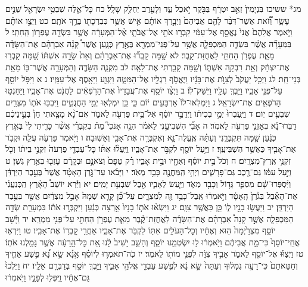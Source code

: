 \documentclass[twoside, openany, parskip=half, 11pt]{book}
\begin{document}
מג* ששיכז בִּנְיָמִין֙ זְאֵ֣ב יִטְרָ֔ף בַּבֹּ֖קֶר יֹ֣אכַל עַ֑ד וְלָעֶ֖רֶב יְחַלֵּ֥ק שָׁלָֽל׃ כח כׇּל־אֵ֛לֶּה שִׁבְטֵ֥י יִשְׂרָאֵ֖ל שְׁנֵ֣ים עָשָׂ֑ר וְ֠זֹ֠את אֲשֶׁר־דִּבֶּ֨ר לָהֶ֤ם אֲבִיהֶם֙ וַיְבָ֣רֶךְ אוֹתָ֔ם אִ֛ישׁ אֲשֶׁ֥ר כְּבִרְכָת֖וֹ בֵּרַ֥ךְ אֹתָֽם׃ כט וַיְצַ֣ו אוֹתָ֗ם וַיֹּ֤אמֶר אֲלֵהֶם֙ אֲנִי֙ נֶאֱסָ֣ף אֶל־עַמִּ֔י קִבְר֥וּ אֹתִ֖י אֶל־אֲבֹתָ֑י אֶ֨ל־הַמְּעָרָ֔ה אֲשֶׁ֥ר בִּשְׂדֵ֖ה עֶפְר֥וֹן הַֽחִתִּֽי׃ ל בַּמְּעָרָ֞ה אֲשֶׁ֨ר בִּשְׂדֵ֧ה הַמַּכְפֵּלָ֛ה אֲשֶׁ֥ר עַל־פְּנֵי־מַמְרֵ֖א בְּאֶ֣רֶץ כְּנָ֑עַן אֲשֶׁר֩ קָנָ֨ה אַבְרָהָ֜ם אֶת־הַשָּׂדֶ֗ה מֵאֵ֛ת עֶפְרֹ֥ן הַחִתִּ֖י לַאֲחֻזַּת־קָֽבֶר׃ לא שָׁ֣מָּה קָֽבְר֞וּ אֶת־אַבְרָהָ֗ם וְאֵת֙ שָׂרָ֣ה אִשְׁתּ֔וֹ שָׁ֚מָּה קָבְר֣וּ אֶת־יִצְחָ֔ק וְאֵ֖ת רִבְקָ֣ה אִשְׁתּ֑וֹ וְשָׁ֥מָּה קָבַ֖רְתִּי אֶת־לֵאָֽה׃ לב מִקְנֵ֧ה הַשָּׂדֶ֛ה וְהַמְּעָרָ֥ה אֲשֶׁר־בּ֖וֹ מֵאֵ֥ת בְּנֵי־חֵֽת׃ לג וַיְכַ֤ל יַעֲקֹב֙ לְצַוֺּ֣ת אֶת־בָּנָ֔יו וַיֶּאֱסֹ֥ף רַגְלָ֖יו אֶל־הַמִּטָּ֑ה וַיִּגְוַ֖ע וַיֵּאָ֥סֶף אֶל־עַמָּֽיו׃ נ א וַיִּפֹּ֥ל יוֹסֵ֖ף עַל־פְּנֵ֣י אָבִ֑יו וַיֵּ֥בְךְּ עָלָ֖יו וַיִּשַּׁק־לֽוֹ׃ ב וַיְצַ֨ו יוֹסֵ֤ף אֶת־עֲבָדָיו֙ אֶת־הָרֹ֣פְאִ֔ים לַחֲנֹ֖ט אֶת־אָבִ֑יו וַיַּחַנְט֥וּ הָרֹפְאִ֖ים אֶת־יִשְׂרָאֵֽל׃ ג וַיִּמְלְאוּ־לוֹ֙ אַרְבָּעִ֣ים י֔וֹם כִּ֛י כֵּ֥ן יִמְלְא֖וּ יְמֵ֣י הַחֲנֻטִ֑ים וַיִּבְכּ֥וּ אֹת֛וֹ מִצְרַ֖יִם שִׁבְעִ֥ים יֽוֹם׃ ד וַיַּֽעַבְרוּ֙ יְמֵ֣י בְכִית֔וֹ וַיְדַבֵּ֣ר יוֹסֵ֔ף אֶל־בֵּ֥ית פַּרְעֹ֖ה לֵאמֹ֑ר אִם־נָ֨א מָצָ֤אתִי חֵן֙ בְּעֵ֣ינֵיכֶ֔ם דַּבְּרוּ־נָ֕א בְּאׇזְנֵ֥י פַרְעֹ֖ה לֵאמֹֽר׃ ה אָבִ֞י הִשְׁבִּיעַ֣נִי לֵאמֹ֗ר הִנֵּ֣ה אָנֹכִי֮ מֵת֒ בְּקִבְרִ֗י אֲשֶׁ֨ר כָּרִ֤יתִי לִי֙ בְּאֶ֣רֶץ כְּנַ֔עַן שָׁ֖מָּה תִּקְבְּרֵ֑נִי וְעַתָּ֗ה אֶֽעֱלֶה־נָּ֛א וְאֶקְבְּרָ֥ה אֶת־אָבִ֖י וְאָשֽׁוּבָה׃ ו וַיֹּ֖אמֶר פַּרְעֹ֑ה עֲלֵ֛ה וּקְבֹ֥ר אֶת־אָבִ֖יךָ כַּאֲשֶׁ֥ר הִשְׁבִּיעֶֽךָ׃ ז וַיַּ֥עַל יוֹסֵ֖ף לִקְבֹּ֣ר אֶת־אָבִ֑יו וַיַּֽעֲל֨וּ אִתּ֜וֹ כׇּל־עַבְדֵ֤י פַרְעֹה֙ זִקְנֵ֣י בֵית֔וֹ וְכֹ֖ל זִקְנֵ֥י אֶֽרֶץ־מִצְרָֽיִם׃ ח וְכֹל֙ בֵּ֣ית יוֹסֵ֔ף וְאֶחָ֖יו וּבֵ֣ית אָבִ֑יו רַ֗ק טַפָּם֙ וְצֹאנָ֣ם וּבְקָרָ֔ם עָזְב֖וּ בְּאֶ֥רֶץ גֹּֽשֶׁן׃ ט וַיַּ֣עַל עִמּ֔וֹ גַּם־רֶ֖כֶב גַּם־פָּרָשִׁ֑ים וַיְהִ֥י הַֽמַּחֲנֶ֖ה כָּבֵ֥ד מְאֹֽד׃ י וַיָּבֹ֜אוּ עַד־גֹּ֣רֶן הָאָטָ֗ד אֲשֶׁר֙ בְּעֵ֣בֶר הַיַּרְדֵּ֔ן וַיִּ֨סְפְּדוּ־שָׁ֔ם מִסְפֵּ֛ד גָּד֥וֹל וְכָבֵ֖ד מְאֹ֑ד וַיַּ֧עַשׂ לְאָבִ֛יו אֵ֖בֶל שִׁבְעַ֥ת יָמִֽים׃ יא וַיַּ֡רְא יוֹשֵׁב֩ הָאָ֨רֶץ הַֽכְּנַעֲנִ֜י אֶת־הָאֵ֗בֶל בְּגֹ֙רֶן֙ הָֽאָטָ֔ד וַיֹּ֣אמְר֔וּ אֵֽבֶל־כָּבֵ֥ד זֶ֖ה לְמִצְרָ֑יִם עַל־כֵּ֞ן קָרָ֤א שְׁמָהּ֙ אָבֵ֣ל מִצְרַ֔יִם אֲשֶׁ֖ר בְּעֵ֥בֶר הַיַּרְדֵּֽן׃ יב וַיַּעֲשׂ֥וּ בָנָ֖יו ל֑וֹ כֵּ֖ן כַּאֲשֶׁ֥ר צִוָּֽם׃ יג וַיִּשְׂא֨וּ אֹת֤וֹ בָנָיו֙ אַ֣רְצָה כְּנַ֔עַן וַיִּקְבְּר֣וּ אֹת֔וֹ בִּמְעָרַ֖ת שְׂדֵ֣ה הַמַּכְפֵּלָ֑ה אֲשֶׁ֣ר קָנָה֩ אַבְרָהָ֨ם אֶת־הַשָּׂדֶ֜ה לַאֲחֻזַּת־קֶ֗בֶר מֵאֵ֛ת עֶפְרֹ֥ן הַחִתִּ֖י עַל־פְּנֵ֥י מַמְרֵֽא׃ יד וַיָּ֨שׇׁב יוֹסֵ֤ף מִצְרַ֙יְמָה֙ ה֣וּא וְאֶחָ֔יו וְכׇל־הָעֹלִ֥ים אִתּ֖וֹ לִקְבֹּ֣ר אֶת־אָבִ֑יו אַחֲרֵ֖י קׇבְר֥וֹ אֶת־אָבִֽיו׃ טו וַיִּרְא֤וּ אֲחֵֽי־יוֹסֵף֙ כִּי־מֵ֣ת אֲבִיהֶ֔ם וַיֹּ֣אמְר֔וּ ל֥וּ יִשְׂטְמֵ֖נוּ יוֹסֵ֑ף וְהָשֵׁ֤ב יָשִׁיב֙ לָ֔נוּ אֵ֚ת כׇּל־הָ֣רָעָ֔ה אֲשֶׁ֥ר גָּמַ֖לְנוּ אֹתֽוֹ׃ טז וַיְצַוּ֕וּ אֶל־יוֹסֵ֖ף לֵאמֹ֑ר אָבִ֣יךָ צִוָּ֔ה לִפְנֵ֥י מוֹת֖וֹ לֵאמֹֽר׃ יז כֹּֽה־תֹאמְר֣וּ לְיוֹסֵ֗ף אָ֣נָּ֡א שָׂ֣א נָ֠א פֶּ֣שַׁע אַחֶ֤יךָ וְחַטָּאתָם֙ כִּי־רָעָ֣ה גְמָל֔וּךָ וְעַתָּה֙ שָׂ֣א נָ֔א לְפֶ֥שַׁע עַבְדֵ֖י אֱלֹהֵ֣י אָבִ֑יךָ וַיֵּ֥בְךְּ יוֹסֵ֖ף בְּדַבְּרָ֥ם אֵלָֽיו׃ יח וַיֵּלְכוּ֙ גַּם־אֶחָ֔יו וַֽיִּפְּל֖וּ לְפָנָ֑יו וַיֹּ֣אמְר֔וּ 
\end{document}
